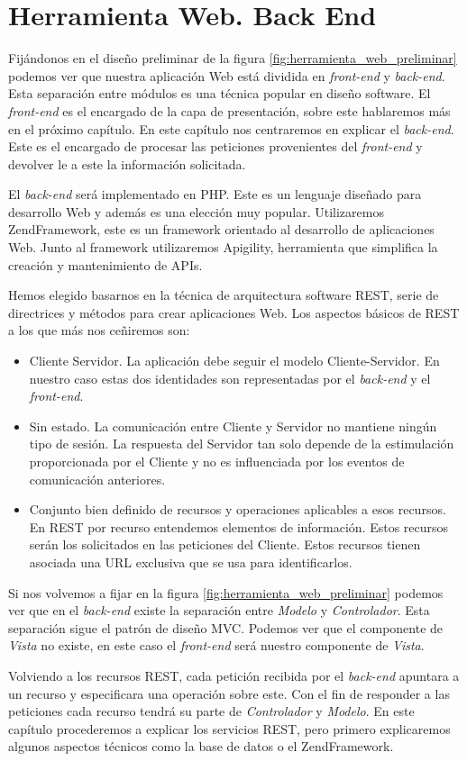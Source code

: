 \chapter{Herramienta Web. Back End}
\label{backend}

Fijándonos en el diseño preliminar de la figura \ref{fig:herramienta_web_preliminar} podemos ver que nuestra aplicación Web está dividida en
\emph{front-end} y \emph{back-end}. Esta separación entre módulos es una técnica popular en diseño software. El \emph{front-end} es el encargado de
la capa de presentación, sobre este hablaremos más en el próximo capítulo. En este capítulo nos centraremos en explicar el \emph{back-end}. Este es el
encargado de procesar las peticiones provenientes del \emph{front-end} y devolver le a este la información solicitada. 
\par
El \emph{back-end} será implementado en PHP\cite{PHP}. Este es un lenguaje diseñado para desarrollo Web y además es una elección muy popular. 
Utilizaremos ZendFramework\cite{ZF}, este es un framework orientado al desarrollo de aplicaciones Web. Junto al framework utilizaremos 
Apigility\cite{Apigility}, herramienta que simplifica la creación y mantenimiento de APIs.
\par
Hemos elegido basarnos en la técnica de arquitectura software REST\cite{Rest}, serie de directrices y métodos para crear aplicaciones Web. Los
aspectos básicos de REST a los que más nos ceñiremos son:
\begin{itemize}
	\item	Cliente Servidor. La aplicación debe seguir el modelo Cliente-Servidor. En nuestro caso estas dos identidades son representadas por el
	  	\emph{back-end} y el \emph{front-end}.
	\item	Sin estado. La comunicación entre Cliente y Servidor no mantiene ningún tipo de sesión. La respuesta del Servidor tan solo depende de
	  	la estimulación proporcionada por el Cliente y no es influenciada por los eventos de comunicación anteriores.
	\item	Conjunto bien definido de recursos y operaciones aplicables a esos recursos. En REST por recurso entendemos elementos de información.
	  	Estos recursos serán los solicitados en las peticiones del Cliente. Estos recursos tienen asociada una URL exclusiva que se usa para
		identificarlos.
\end{itemize}
Si nos volvemos a fijar en la figura \ref{fig:herramienta_web_preliminar} podemos ver que en el \emph{back-end} existe la separación entre
\emph{Modelo} y \emph{Controlador}. Esta separación sigue el patrón de diseño MVC\cite{MVCWiki}. Podemos ver que el componente de \emph{Vista} no
existe, en este caso el \emph{front-end} será nuestro componente de \emph{Vista}.
\par
Volviendo a los recursos REST, cada petición recibida por el \emph{back-end} apuntara a un recurso y especificara una operación sobre este. Con el fin
de responder a las peticiones cada recurso tendrá su parte de \emph{Controlador} y \emph{Modelo}. En este capítulo procederemos a explicar los
servicios REST, pero primero explicaremos algunos aspectos técnicos como la base de datos o el ZendFramework.
